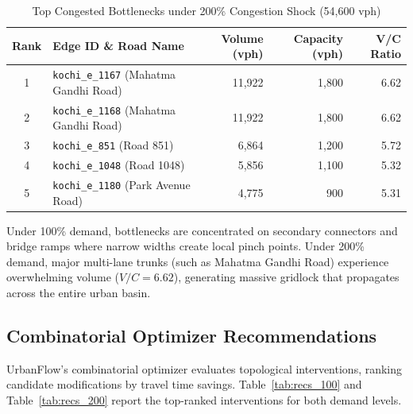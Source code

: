 \documentclass[12pt,a4paper]{report}
\begin{document}
\begin{table}[H]
\centering
\caption{Top Congested Bottlenecks under 200\% Congestion Shock (54,600 vph)}
\label{tab:bottlenecks_200}
\vspace{0.15cm}
\footnotesize
\setlength{\tabcolsep}{4pt}
\begin{tabularx}{\textwidth}{cXrrr}
\toprule
\textbf{Rank} & \textbf{Edge ID \& Road Name} & \textbf{Volume (vph)} & \textbf{Capacity (vph)} & \textbf{V/C Ratio} \\
\midrule
1 & \texttt{kochi\_e\_1167} (Mahatma Gandhi Road) & 11,922 & 1,800 & 6.62 \\
2 & \texttt{kochi\_e\_1168} (Mahatma Gandhi Road) & 11,922 & 1,800 & 6.62 \\
3 & \texttt{kochi\_e\_851} (Road 851) & 6,864 & 1,200 & 5.72 \\
4 & \texttt{kochi\_e\_1048} (Road 1048) & 5,856 & 1,100 & 5.32 \\
5 & \texttt{kochi\_e\_1180} (Park Avenue Road) & 4,775 & 900 & 5.31 \\
\bottomrule
\end{tabularx}
\end{table}

Under 100\% demand, bottlenecks are concentrated on secondary connectors and bridge ramps where narrow widths create local pinch points. Under 200\% demand, major multi-lane trunks (such as Mahatma Gandhi Road) experience overwhelming volume ($V/C = 6.62$), generating massive gridlock that propagates across the entire urban basin.

\subsection*{Combinatorial Optimizer Recommendations}
UrbanFlow's combinatorial optimizer evaluates topological interventions, ranking candidate modifications by travel time savings. Table~\ref{tab:recs_100} and Table~\ref{tab:recs_200} report the top-ranked interventions for both demand levels.
\end{document}
